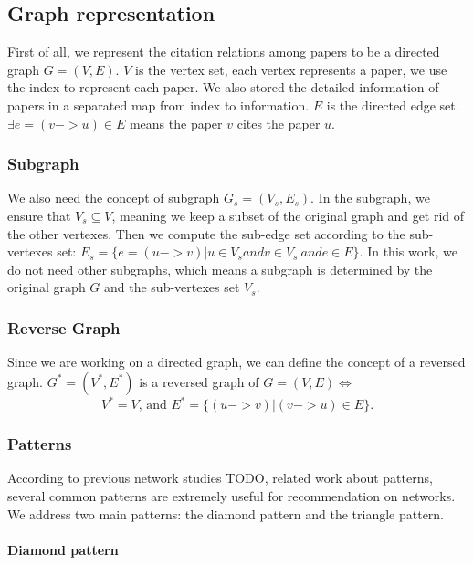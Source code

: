 \subsection{Graph representation}

First of all, we represent the citation relations among papers to be a directed graph $G=(V, E)$. $V$ is the vertex set, each vertex represents a paper, we use the index to represent each paper. We also stored the detailed information of papers in a separated map from index to information. $E$ is the directed edge set. $\exists e=(v -> u) \in E$ means the paper $v$ cites the paper $u$.

\subsubsection{Subgraph}
We also need the concept of subgraph $G_s = (V_s, E_s)$. In the subgraph, we ensure that $V_s \subseteq V$, meaning we keep a subset of the original graph and get rid of the other vertexes. Then we compute the sub-edge set according to the sub-vertexes set: $E_s = \{e=(u -> v) | u \in V_s and v \in V_s\ and e \in E\}$. In this work, we do not need other subgraphs, which means a subgraph is determined by the original graph $G$ and the sub-vertexes set $V_s$.

\subsubsection{Reverse Graph}
Since we are working on a directed graph, we can define the concept of a reversed graph. $G^*=(V^*, E^*)$ is a reversed graph of $G=(V, E)\iff $
\begin{equation}
 V^* = V \text{, and } E^* = \{(u -> v)| (v->u) \in E\}.
\end{equation}

\subsubsection{Patterns}

According to previous network studies {TODO, related work about patterns}, several common patterns are extremely useful for recommendation on networks. We address two main patterns: the diamond pattern and the triangle pattern. 

\paragraph{Diamond pattern}

